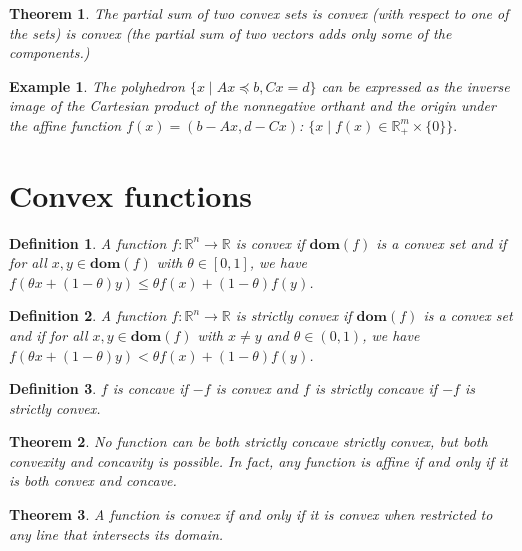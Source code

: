\documentclass[a4paper]{article}
\newtheorem{mytheorem}{Theorem}
\newtheorem{example}{Example}
\newtheorem{mydef}{Definition}
\numberwithin{mytheorem}{section}
\numberwithin{mydef}{section}
\numberwithin{example}{section}
\begin{document}
\begin{mytheorem} The partial sum of two convex sets is convex (with respect to one of the sets) is convex (the partial sum of two vectors adds only some of the components.)  \end{mytheorem}

\begin{example} The polyhedron $ \{ x \mid Ax \preceq b, Cx = d \}$ can be expressed as the inverse image of the Cartesian product of the nonnegative orthant and the origin under the affine function $f(x) = (b- Ax, d - Cx)$: 
$\{ x \mid f(x) \in \mathbb{R}^{m}_{+} \times \{ 0 \} \}.$ \end{example}

\section{Convex functions}

\begin{mydef} A function $f : \mathbb{R}^{n} \rightarrow \mathbb{R} $ is convex if $\textbf{dom}(f)$ is a convex set and if for all $x,y \in \textbf{dom}(f)$ with $\theta \in [0,1]$, we have $f(\theta x + (1-\theta)y) \leq \theta f(x) + (1-\theta)f(y)$.  \end{mydef}

\begin{mydef} A function $f : \mathbb{R}^{n} \rightarrow \mathbb{R} $ is strictly convex if $\textbf{dom}(f)$ is a convex set and if for all $x,y \in \textbf{dom}(f)$ with $x \neq y$ and $\theta \in (0,1)$, we have $f(\theta x + (1-\theta)y) < \theta f(x) + (1-\theta)f(y)$.  \end{mydef}

\begin{mydef} $f$ is concave if $-f$ is convex and $f$ is strictly concave if $-f$ is strictly convex.  \end{mydef}

\begin{mytheorem} No function can be both strictly concave strictly convex, but both convexity and concavity is possible. In fact, any function is affine if and only if it is both convex and concave. \end{mytheorem}

\begin{mytheorem} A function is convex if and only if it is convex when restricted to any line that intersects its domain. \end{mytheorem}
\end{document}
